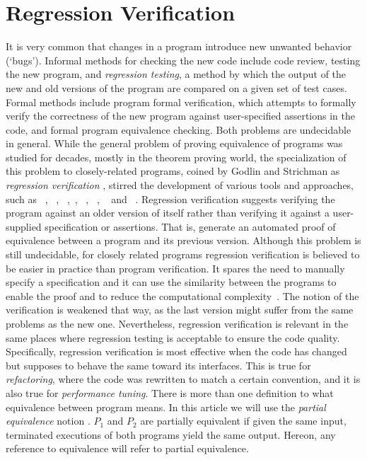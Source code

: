 
\section{Regression Verification}
It is very common that changes in a program introduce new unwanted behavior (`bugs'). Informal methods for checking the new code include code review, testing the new program, and \emph{regression testing}, a method by which the output of the new and old versions of the program are compared on a given set of test cases. Formal methods include program formal verification, which attempts to formally verify the correctness of the new program against user-specified assertions in the code, and formal program equivalence checking. Both problems are undecidable in general. While the general problem of proving equivalence of programs was studied for decades, mostly in the theorem proving world, the specialization of this problem to closely-related programs, coined by  
Godlin and Strichman as \emph{regression verification} \cite{DBLP:conf/dac/GodlinS09}, stirred the development of various tools and approaches, such as ~\cite{DBLP:conf/dac/GodlinS09}, ~\cite{DBLP:conf/kbse/FelsingGKRU14}, ~\cite{DBLP:conf/cav/LahiriHKR12},~\cite{10.1145/3368089.3409757}, ~\cite{10.1145/3238147.3238178}, ~\cite{10.1007/978-3-319-66706-5_20}, ~\cite{inproceedings} and ~\cite{10.1145/1453101.1453131}. Regression verification suggests verifying the program against an older version of itself rather than verifying it against a user-supplied specification or assertions. That is, generate an automated proof of equivalence between a program and its previous version. Although this problem is still undecidable, for closely related programs regression verification is believed to be easier in practice than program verification. It spares the need to manually specify a specification and it can use the similarity between the programs to enable the proof  and to reduce the computational complexity~\cite{DBLP:conf/dac/GodlinS09}. The notion of the verification is weakened that way, as the last version might suffer from the same problems as the new one. Nevertheless, regression verification is relevant in the same places where regression testing is acceptable to ensure the code quality. Specifically, regression verification is most effective when the code has changed but supposes to behave the same toward its interfaces. This is true for \emph{refactoring}, where the code was rewritten to match a certain convention, and it is also true for \emph{performance tuning}. There is more than one definition to what equivalence between program means. In this article we will use the \emph{partial equivalence} notion \cite{DBLP:conf/dac/GodlinS09}. $P_1$ and $P_2$ are partially equivalent if given the same input, terminated executions of both programs yield the same output. Hereon, any reference to equivalence will refer to partial equivalence.

